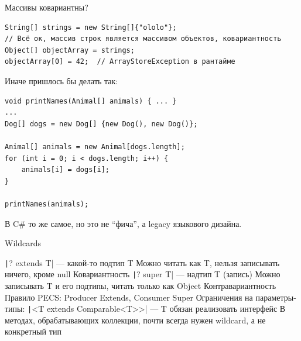 \documentclass{../../slides-style}
\begin{document}
    \begin{frame}[fragile]{Массивы ковариантны?}
        \begin{small}
            \begin{verbatim}
String[] strings = new String[]{"ololo"};
// Всё ок, массив строк является массивом объектов, ковариантность
Object[] objectArray = strings; 
objectArray[0] = 42;  // ArrayStoreException в рантайме
        \end{verbatim}
        Иначе пришлось бы делать так:

        \begin{verbatim}
void printNames(Animal[] animals) { ... }
...
Dog[] dogs = new Dog[] {new Dog(), new Dog()};

Animal[] animals = new Animal[dogs.length];
for (int i = 0; i < dogs.length; i++) {
    animals[i] = dogs[i];
}

printNames(animals);
            \end{verbatim}
        \end{small}
        В C\# то же самое, но это не \enquote{фича}, а legacy языкового дизайна.
    \end{frame}

    \begin{frame}{Wildcards}
        \begin{outline}
            \1 \texttt|? extends T| --- какой-то подтип T
                \2 Можно читать как T, нельзя записывать ничего, кроме null
                \2 Ковариантность
            \1 \texttt|? super T| --- надтип T (запись)
                \2 Можно записывать T и его подтипы, читать только как Object
                \2 Контравариантность
            \1 Правило PECS: Producer Extends, Consumer Super
            \1 Ограничения на параметры-типы: \texttt|<T extends Comparable<T>>| --- T обязан реализовать интерфейс
            \1 В методах, обрабатывающих коллекции, почти всегда нужен wildcard, а не конкретный тип
        \end{outline}
    \end{frame}
\end{document}
